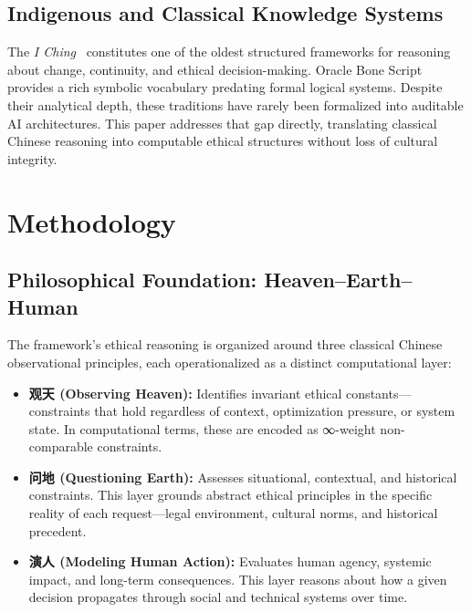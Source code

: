 \documentclass[conference]{IEEEtran}
\begin{document}
\subsection{Indigenous and Classical Knowledge Systems}

The \textit{I Ching}~\cite{wilhelm1994iching,shaughnessy1997unearthed}
constitutes one of the oldest structured frameworks for reasoning
about change, continuity, and ethical decision-making. Oracle
Bone Script~\cite{keightley1978shang} provides a rich symbolic
vocabulary predating formal logical systems. Despite their
analytical depth, these traditions have rarely been formalized
into auditable AI architectures. This paper addresses that gap
directly, translating classical Chinese reasoning into
computable ethical structures without loss of cultural integrity.

\section{Methodology}

\subsection{Philosophical Foundation: Heaven--Earth--Human}

The framework's ethical reasoning is organized around three
classical Chinese observational principles, each operationalized
as a distinct computational layer:

\begin{itemize}
  \item \textbf{观天 (Observing Heaven):} Identifies invariant
  ethical constants---constraints that hold regardless of
  context, optimization pressure, or system state. In
  computational terms, these are encoded as ∞-weight
  non-comparable constraints.

  \item \textbf{问地 (Questioning Earth):} Assesses situational,
  contextual, and historical constraints. This layer grounds
  abstract ethical principles in the specific reality of each
  request---legal environment, cultural norms, and historical
  precedent.

  \item \textbf{演人 (Modeling Human Action):} Evaluates human
  agency, systemic impact, and long-term consequences. This
  layer reasons about how a given decision propagates through
  social and technical systems over time.
\end{itemize}
\end{document}
